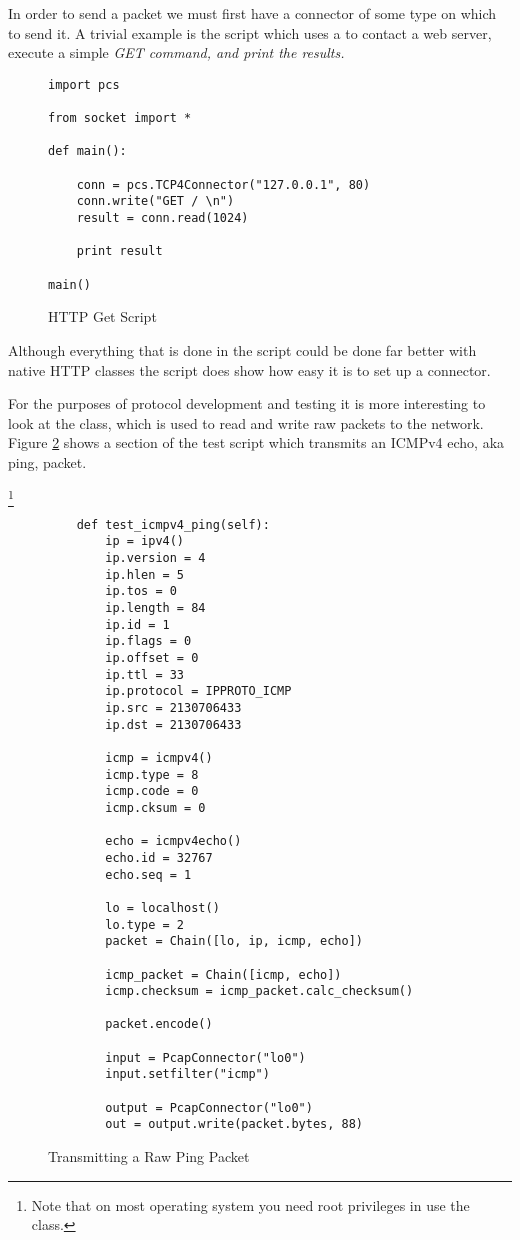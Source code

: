 \documentclass[11pt]{article}
\begin{document}
In order to send a packet we must first have a connector of some type
on which to send it.  A trivial example is the 
script which uses a  to contact a web server,
execute a simple \em{GET} command, and print the results.

\begin{figure}
  \centering
\begin{verbatim}
import pcs

from socket import *

def main():

    conn = pcs.TCP4Connector("127.0.0.1", 80)
    conn.write("GET / \n")
    result = conn.read(1024)

    print result

main()
\end{verbatim}
  \caption{HTTP Get Script}
  \label{fig:http-get-script}
\end{figure}

Although everything that is done in the  script
could be done far better with  native HTTP classes
the script does show how easy it is to set up a connector.

For the purposes of protocol development and testing it is more
interesting to look at the  class, which is used
to read and write raw packets to the network.  Figure
\ref{fig:transmitting-a-raw-ping-packet} shows a section of the
 test script which transmits an ICMPv4 echo, aka
ping, packet.  

\footnote{Note that on most operating system you need root privileges
  in use the  class.}

\begin{figure}
  \centering
\begin{verbatim}
    def test_icmpv4_ping(self):
        ip = ipv4()
        ip.version = 4
        ip.hlen = 5
        ip.tos = 0
        ip.length = 84
        ip.id = 1
        ip.flags = 0
        ip.offset = 0
        ip.ttl = 33
        ip.protocol = IPPROTO_ICMP
        ip.src = 2130706433
        ip.dst = 2130706433

        icmp = icmpv4()
        icmp.type = 8
        icmp.code = 0
        icmp.cksum = 0
        
        echo = icmpv4echo()
        echo.id = 32767
        echo.seq = 1

        lo = localhost()
        lo.type = 2
        packet = Chain([lo, ip, icmp, echo])
        
        icmp_packet = Chain([icmp, echo])
        icmp.checksum = icmp_packet.calc_checksum()

        packet.encode()

        input = PcapConnector("lo0")
        input.setfilter("icmp")

        output = PcapConnector("lo0")
        out = output.write(packet.bytes, 88)
\end{verbatim}
  \caption{Transmitting a Raw Ping Packet}
  \label{fig:transmitting-a-raw-ping-packet}
\end{figure}
\end{document}
